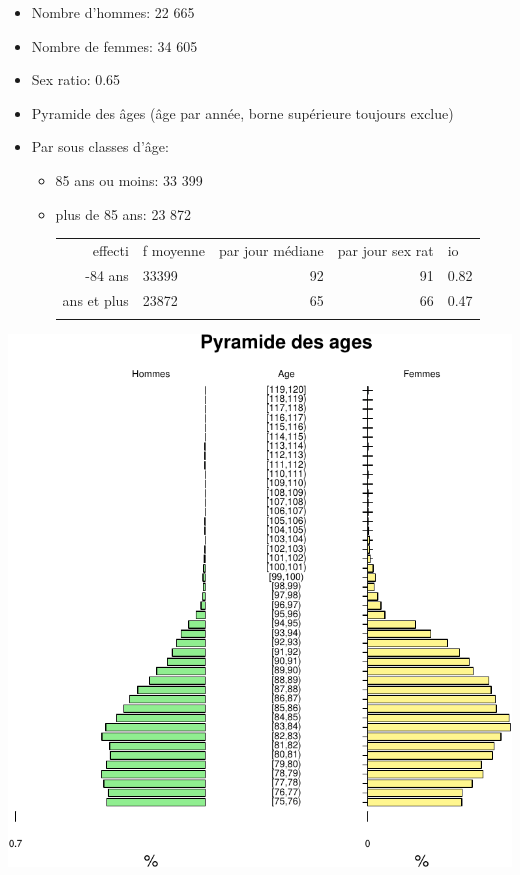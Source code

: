 \documentclass[]{article}
\begin{document}
\begin{itemize}
\itemsep1pt\parskip0pt
\item
  Nombre d'hommes: 22 665
\item
  Nombre de femmes: 34 605
\item
  Sex ratio: 0.65
\item
  Pyramide des âges (âge par année, borne supérieure toujours exclue)
\item
  Par sous classes d'âge:

  \begin{itemize}
  \item
    85 ans ou moins: 33 399
  \item
    plus de 85 ans: 23 872

    \begin{longtable}[c]{@{}rlrrl@{}}
    \toprule\addlinespace
    effecti & f moyenne & par jour médiane & par jour sex rat & io
    \\\addlinespace
    \midrule\endhead
    75-84 ans & 33399 & 92 & 91 & 0.82
    \\\addlinespace
    85 ans et plus & 23872 & 65 & 66 & 0.47
    \\\addlinespace
    \bottomrule
    \end{longtable}
  \end{itemize}
\end{itemize}

\includegraphics{rapport2014_V4_files/figure-latex/sous_classe_age-1.pdf}
\end{document}
